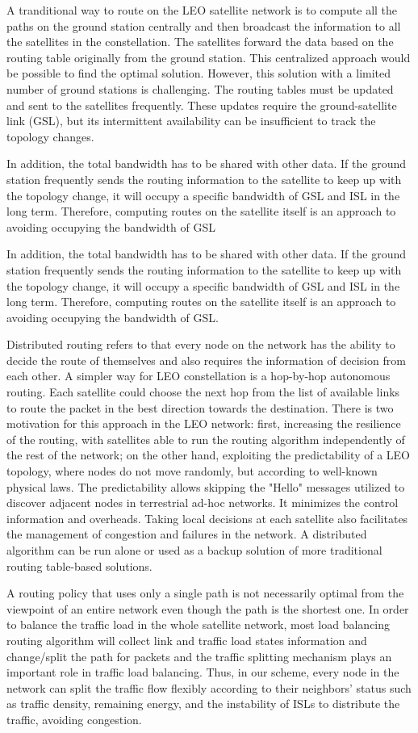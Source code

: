 A tranditional way to route on the LEO satellite network is to compute all the paths on the ground station centrally and then broadcast the information to all the satellites in the constellation. The satellites forward the data based on the routing table originally from the ground station. This centralized approach would be possible to find the optimal solution. However, this solution with a limited number of ground stations is challenging. The routing tables must be updated and sent to the satellites frequently. These updates require the ground-satellite link (GSL), but its intermittent availability can be insufficient to track the topology changes.

In addition, the total bandwidth has to be shared with other data. If the ground station frequently sends the routing information to the satellite to keep up with the topology change, it will occupy a specific bandwidth of GSL and ISL in the long term. Therefore, computing routes on the satellite itself is an approach to avoiding occupying the bandwidth of GSL

In addition, the total bandwidth has to be shared with other data. If the ground station frequently sends the routing information to the satellite to keep up with the topology change, it will occupy a specific bandwidth of GSL and ISL in the long term. Therefore, computing routes on the satellite itself is an approach to avoiding occupying the bandwidth of GSL.

Distributed routing refers to that every node on the network has the ability to decide the route of themselves and also requires the information of decision from each other. A simpler way for LEO constellation is a hop-by-hop autonomous routing. Each satellite could choose the next hop from the list of available links to route the packet in the best direction towards the destination. There is two motivation for this approach in the LEO network: first, increasing the resilience of the routing, with satellites able to run the routing algorithm independently of the rest of the network; on the other hand, exploiting the predictability of a LEO topology, where nodes do not move randomly, but according to well-known physical laws. The predictability allows skipping the "Hello" messages utilized to discover adjacent nodes in terrestrial ad-hoc networks. It minimizes the control information and overheads. Taking local decisions at each satellite also facilitates the management of congestion and failures in the network. A distributed algorithm can be run alone or used as a backup solution of more traditional routing table-based solutions.

A routing policy that uses only a single path is not necessarily optimal from the viewpoint of an entire network even though the path is the shortest one.
In order to balance the traffic load in the whole satellite network, most load balancing routing algorithm will collect link and traffic load states information and change/split the path for packets
and the traffic splitting mechanism plays an important role in traffic load balancing. Thus, in our scheme, every node in the network can split the traffic flow flexibly according to their neighbors' status such as traffic density, remaining energy, and the instability of ISLs to distribute the traffic, avoiding congestion.